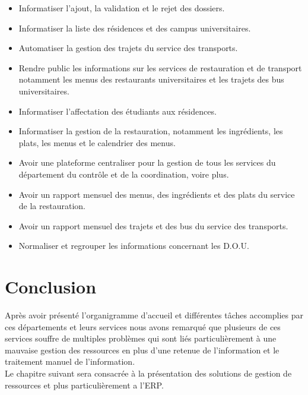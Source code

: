     \begin{itemize}
        \item Informatiser l'ajout, la validation et le rejet des dossiers.
        \item Informatiser la liste des résidences et des campus universitaires.
        \item Automatiser la gestion des trajets du service des transports.
        \item Rendre public les informations sur les services de restauration et de transport notamment les menus des restaurants universitaires et les trajets des bus universitaires. 
        \item Informatiser l'affectation des étudiants aux résidences.
        \item Informatiser la gestion de la restauration, notamment les ingrédients, les plats, les menus et le calendrier des menus.
        \item Avoir une plateforme centraliser pour la gestion de tous les services du département du contrôle et de la coordination, voire plus.
        \item Avoir un rapport mensuel des menus, des ingrédients et des plats du service de la restauration.
        \item Avoir un rapport mensuel des trajets et des bus du service des transports.
        \item Normaliser et regrouper les informations concernant les \acs{D.O.U}.\\
    \end{itemize}

\section{Conclusion}
    Après avoir présenté l’organigramme d’accueil et différentes tâches accomplies par ces départements et leurs services nous avons remarqué que plusieurs de ces services souffre de multiples problèmes qui sont liés particulièrement à une mauvaise gestion des ressources en plus d’une retenue de l’information et le traitement manuel de l'information.\\

    Le chapitre suivant sera consacrée à la présentation des solutions de gestion de ressources et plus particulièrement a l'\acs{ERP}.

\newpage

\leftskip=0cm
\renewcommand{\bibname}{Référence bibliographique et webographique du chapitre 1}
	
